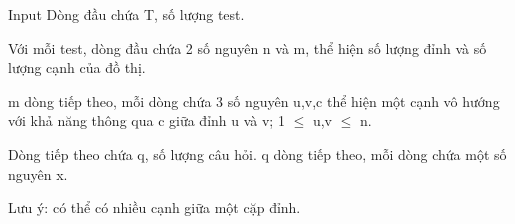 Input
Dòng đầu chứa T, số lượng test.  

   Với mỗi test, dòng đầu chứa 2 số nguyên n và m, thể hiện số lượng đỉnh và số lượng cạnh của đồ thị.  

   m dòng tiếp theo, mỗi dòng chứa 3 số nguyên u,v,c thể hiện một cạnh vô hướng với khả năng thông qua c giữa đỉnh u và v; 1  $\le$  u,v  $\le$  n.  

   Dòng tiếp theo chứa q, số lượng câu hỏi. q dòng tiếp theo, mỗi dòng chứa một số nguyên x.  

   Lưu ý: có thể có nhiều cạnh giữa một cặp đỉnh.